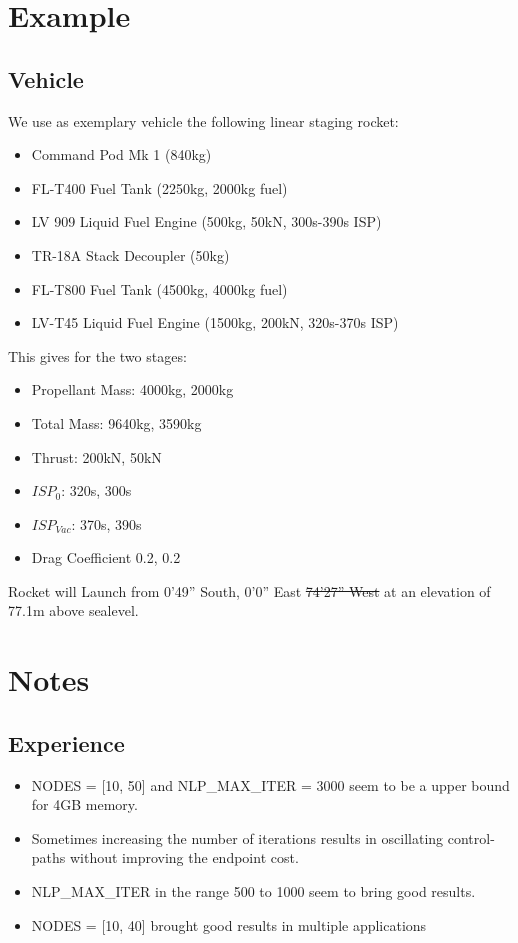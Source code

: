 \documentclass[11pt]{report}
\begin{document}
\chapter{Example}

\section{Vehicle}

We use as exemplary vehicle the following linear staging rocket:

\begin{itemize}
\item Command Pod Mk 1 (840kg)
\item FL-T400 Fuel Tank (2250kg, 2000kg fuel)
\item LV 909 Liquid Fuel Engine (500kg, 50kN, 300s-390s ISP)
\item TR-18A Stack Decoupler (50kg)
\item FL-T800 Fuel Tank (4500kg, 4000kg fuel)
\item LV-T45 Liquid Fuel Engine (1500kg, 200kN, 320s-370s ISP)
\end{itemize}

This gives for the two stages:

\begin{itemize}
\item Propellant Mass: 4000kg, 2000kg
\item Total Mass: 9640kg, 3590kg
\item Thrust: 200kN, 50kN
\item $ISP_0$: 320s, 300s
\item $ISP_{Vac}$: 370s, 390s
\item Drag Coefficient 0.2, 0.2
\end{itemize}

Rocket will Launch from 0'49'' South, 0'0''
East \sout{74'27'' West} at an elevation of 77.1m above
sealevel.

\chapter{Notes}

\section{Experience}

\begin{itemize}
\item NODES = [10, 50] and NLP\_MAX\_ITER = 3000 seem to be a upper
  bound for 4GB memory.
\item Sometimes increasing the number of iterations results in
  oscillating control-paths without improving the endpoint cost.
\item NLP\_MAX\_ITER in the range 500 to 1000 seem to bring good
  results.
\item NODES = [10, 40] brought good results in multiple applications
\end{itemize}
\end{document}
